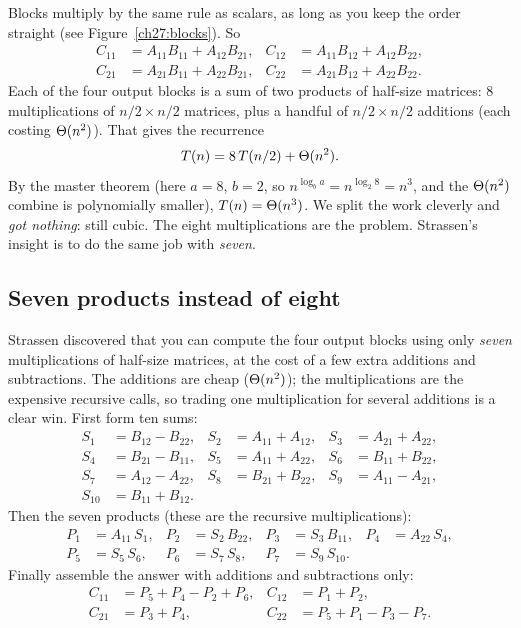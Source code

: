 Blocks multiply by the same rule as scalars, as long as
you keep the order straight (see Figure~\ref{ch27:blocks}). So
$$
\begin{aligned}
C_{11}&=A_{11}B_{11}+A_{12}B_{21}, & C_{12}&=A_{11}B_{12}+A_{12}B_{22},\\
C_{21}&=A_{21}B_{11}+A_{22}B_{21}, & C_{22}&=A_{21}B_{12}+A_{22}B_{22}.
\end{aligned}
$$
Each of the four output blocks is a sum of two products of half-size matrices:
$8$ multiplications of $n/2\times n/2$ matrices, plus a handful of $n/2\times n/2$
additions (each costing $\Theta(n^2)$). That gives the recurrence
$$
T(n)=8\,T(n/2)+\Theta(n^2).
$$
By the master theorem (here $a=8$, $b=2$, so $n^{\log_b a}=n^{\log_2 8}=n^3$, and
the $\Theta(n^2)$ combine is polynomially smaller), $T(n)=\Theta(n^3)$. We split the
work cleverly and \emph{got nothing}: still cubic. The eight multiplications are
the problem. Strassen's insight is to do the same job with \emph{seven}.

\subsection{Seven products instead of eight}

Strassen discovered that you can compute the four output blocks using only
\emph{seven} multiplications of half-size matrices, at the cost of a few extra
additions and subtractions. The additions are cheap ($\Theta(n^2)$); the
multiplications are the expensive recursive calls, so trading one multiplication
for several additions is a clear win. First form ten sums:
$$
\begin{aligned}
S_1&=B_{12}-B_{22}, & S_2&=A_{11}+A_{12}, & S_3&=A_{21}+A_{22},\\
S_4&=B_{21}-B_{11}, & S_5&=A_{11}+A_{22}, & S_6&=B_{11}+B_{22},\\
S_7&=A_{12}-A_{22}, & S_8&=B_{21}+B_{22}, & S_9&=A_{11}-A_{21},\\
S_{10}&=B_{11}+B_{12}. & & & &
\end{aligned}
$$
Then the seven products (these are the recursive multiplications):
$$
\begin{aligned}
P_1&=A_{11}\,S_1, & P_2&=S_2\,B_{22}, & P_3&=S_3\,B_{11}, & P_4&=A_{22}\,S_4,\\
P_5&=S_5\,S_6, & P_6&=S_7\,S_8, & P_7&=S_9\,S_{10}. & &
\end{aligned}
$$
Finally assemble the answer with additions and subtractions only:
$$
\begin{aligned}
C_{11}&=P_5+P_4-P_2+P_6, & C_{12}&=P_1+P_2,\\
C_{21}&=P_3+P_4, & C_{22}&=P_5+P_1-P_3-P_7.
\end{aligned}
$$

